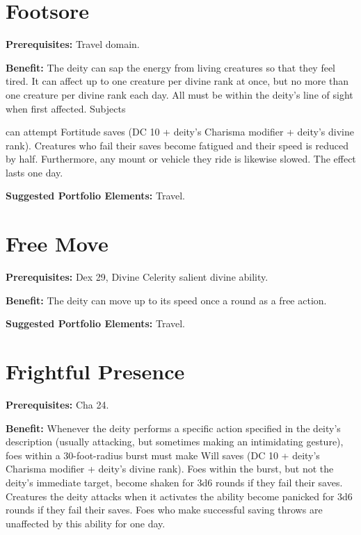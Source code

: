 \documentclass{article}
\begin{document}
\section*{Footsore}

\textbf{Prerequisites:} Travel domain.

\textbf{Benefit:} The deity can sap the energy from living creatures so that they 
feel tired. It can affect up to one creature per divine rank at once, but no more 
than one creature per divine rank each day. All must be within the deity's line 
of sight when first affected. Subjects

can attempt Fortitude saves (DC 10 + deity's Charisma modifier + deity's divine 
rank). Creatures who fail their saves become fatigued and their speed is reduced 
by half. Furthermore, any mount or vehicle they ride is likewise slowed. The effect 
lasts one day.

\textbf{Suggested Portfolio Elements:} Travel.

\vspace{12pt}
\section*{Free Move}

\textbf{Prerequisites:} Dex 29, Divine Celerity salient divine ability.

\textbf{Benefit:} The deity can move up to its speed once a round as a free action.

\textbf{Suggested Portfolio Elements:} Travel.

\vspace{12pt}
\section*{Frightful Presence}

\textbf{Prerequisites:} Cha 24.

\textbf{Benefit:} Whenever the deity performs a specific action specified in the 
deity's description (usually attacking, but sometimes making an intimidating gesture), 
foes within a 30-foot-radius burst must make Will saves (DC 10 + deity's Charisma 
modifier + deity's divine rank). Foes within the burst, but not the deity's immediate 
target, become shaken for 3d6 rounds if they fail their saves. Creatures the deity 
attacks when it activates the ability become panicked for 3d6 rounds if they fail 
their saves. Foes who make successful saving throws are unaffected by this ability 
for one day.
\end{document}
